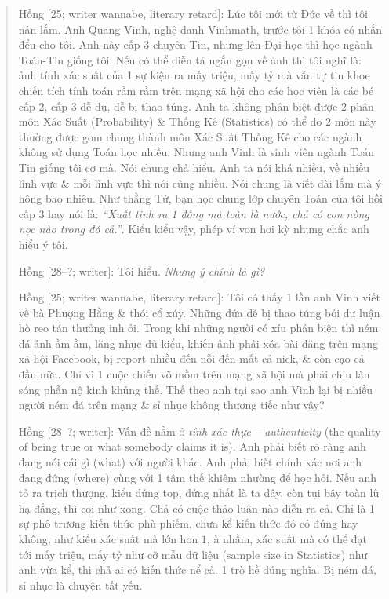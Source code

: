 \documentclass[12pt,twoside]{book}
\begin{document}
\begin{quote}
	{\sf Hồng [25; writer wannabe, literary retard]}: Lúc tôi mới từ Đức về thì tôi nản lắm. Anh Quang Vinh, nghệ danh Vinhmath, trước tôi 1 khóa có nhắn đểu cho tôi. Anh này cấp 3 chuyên Tin, nhưng lên Đại học thì học ngành Toán-Tin giống tôi. Nếu có thể diễn tả ngắn gọn về ảnh thì tôi nghĩ là: ảnh tính xác suất của 1 sự kiện ra mấy triệu, mấy tỷ mà vẫn tự tin khoe chiến tích tính toán rầm rầm trên mạng xã hội cho các học viên là các bé cấp 2, cấp 3 dễ dụ, dễ bị thao túng. Anh ta không phân biệt được 2 phân môn Xác Suất (Probability) \& Thống Kê (Statistics) có thể do 2 môn này thường được gom chung thành môn Xác Suất Thống Kê cho các ngành không sử dụng Toán học nhiều. Nhưng anh Vinh là sinh viên ngành Toán Tin giống tôi cơ mà. Nói chung chả hiểu. Anh ta nói khá nhiều, về nhiều lĩnh vực \& mỗi lĩnh vực thì nói cũng nhiều. Nói chung là viết dài lắm mà ý hông bao nhiêu. Như thằng {\sf Tử}, bạn học chung lớp chuyên Toán của tôi hồi cấp 3 hay nói là: {\it``Xuất tinh ra 1 đống mà toàn là nước, chả có con nòng nọc nào trong đó cả.''}. Kiểu kiểu vậy, phép ví von hơi kỳ nhưng chắc anh hiểu ý tôi.
	
	{\sf Hồng [28--?; writer]}: Tôi hiểu. {\it Nhưng ý chính là gì?}
	
	{\sf Hồng [25; writer wannabe, literary retard]}: Tôi có thấy 1 lần anh Vinh viết về bà Phượng Hằng \& thói cổ xúy. Những đứa dễ bị thao túng bởi dư luận hò reo tán thưởng inh ỏi. Trong khi những người có xíu phản biện thì ném đá ảnh ầm ầm, lăng nhục đủ kiểu, khiến ảnh phải xóa bài đăng trên mạng xã hội Facebook, bị report nhiều đến nỗi đến mất cả nick, \& còn cạo cả đầu nữa. Chỉ vì 1 cuộc chiến võ mồm trên mạng xã hội mà phải chịu làn sóng phẫn nộ kinh khủng thế. Thế theo anh tại sao anh Vinh lại bị nhiều người ném đá trên mạng \& sỉ nhục không thương tiếc như vậy?
	
	{\sf Hồng [28--?; writer]}: Vấn đề nằm ở {\it tính xác thực -- authenticity} ({\sf[n] the quality of being true or what somebody claims it is}). Anh phải biết rõ ràng anh đang nói cái gì (what) với người khác. Anh phải biết chính xác nơi anh đang đứng (where) cùng với 1 tâm thế khiêm nhường để học hỏi. Nếu anh tỏ ra trịch thượng, kiểu đứng top, đứng nhất là ta đây, còn tụi bây toàn lũ hạ đẳng, thì coi như xong. Chả có cuộc thảo luận nào diễn ra cả. Chỉ là 1 sự phô trương kiến thức phù phiếm, chưa kể kiến thức đó có đúng hay không, như kiểu xác suất mà lớn hơn $1$, à nhầm, xác suất mà có thể đạt tới mấy triệu, mấy tỷ như cỡ mẫu dữ liệu (sample size in Statistics) như anh vừa kể, thì chả ai có kiến thức nể cả. 1 trò hề đúng nghĩa. Bị ném đá, sỉ nhục là chuyện tất yếu.
	

\end{quote}
\end{document}
